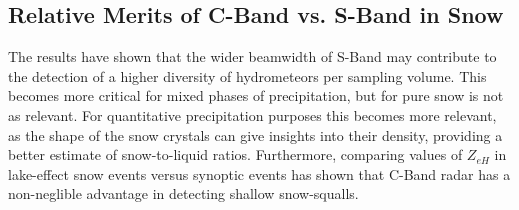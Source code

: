 \subsection{Relative Merits of C-Band vs. S-Band in Snow}
The results have shown that the wider beamwidth of S-Band may contribute to the detection of a higher diversity of hydrometeors per sampling volume. This
becomes more critical for mixed phases of precipitation, but for pure snow is not as relevant. For quantitative precipitation purposes this becomes more
relevant, as the shape of the snow crystals can give insights into their density, providing a better estimate of snow-to-liquid ratios. Furthermore,
comparing values of $Z_{eH}$ in lake-effect snow events versus synoptic events has shown that C-Band radar has a non-neglible advantage in detecting shallow snow-squalls.


